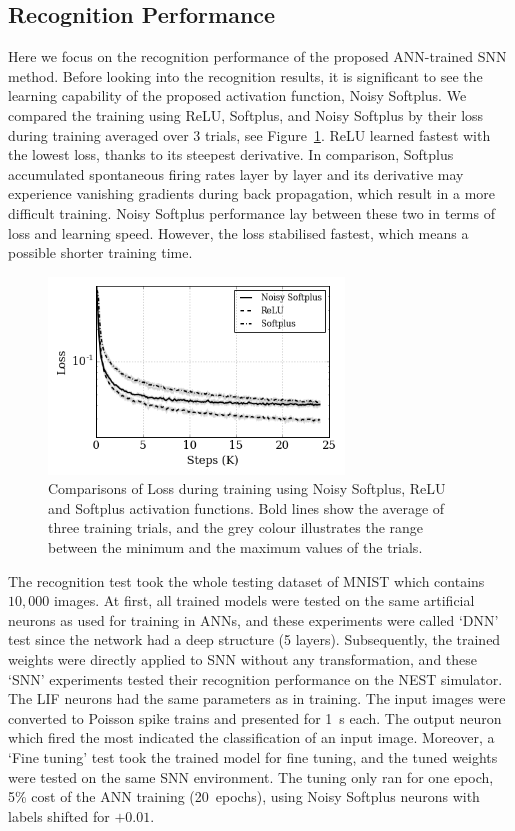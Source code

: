 	\subsection{Recognition Performance}
	\label{subsec:result_compare}
	Here we focus on the recognition performance of the proposed ANN-trained SNN method.
	Before looking into the recognition results, it is significant to see the learning capability of the proposed activation function, Noisy Softplus.
	We compared the training using ReLU, Softplus, and Noisy Softplus by their loss during training averaged over 3 trials, see Figure~\ref{Fig:loss_ns}.
	ReLU learned fastest with the lowest loss, thanks to its steepest derivative.
	In comparison, Softplus accumulated spontaneous firing rates layer by layer and its derivative may experience vanishing gradients during back propagation, which result in a more difficult training.
	Noisy Softplus performance lay between these two in terms of loss and learning speed.
	However, the loss stabilised fastest, which means a possible shorter training time.
	\begin{figure}[tbp!]
		\centering
		\includegraphics[width=0.7\textwidth]{pics_iconip/8.png}
		\caption{Comparisons of Loss during training using Noisy Softplus, ReLU and Softplus activation functions. Bold lines show the average of three training trials, and the grey colour illustrates the range between the minimum and the maximum values of the trials.  }
		\label{Fig:loss_ns}
	\end{figure}
	
	The recognition test took the whole testing dataset of MNIST which contains $10,000$ images.
	At first, all trained models were tested on the same artificial neurons as used for training in ANNs, and these experiments were called `DNN' test since the network had a deep structure (5 layers).
	Subsequently, the trained weights were directly applied to SNN without any transformation, and these `SNN' experiments tested their recognition performance on the NEST simulator.
	The LIF neurons had the same parameters as in training.
	The input images were converted to Poisson spike trains and presented for 1~s each.
	The output neuron which fired the most indicated the classification of an input image.
	Moreover, a `Fine tuning' test took the trained model for fine tuning, and the tuned weights were tested on the same SNN environment.
	The tuning only ran for one epoch, 5\% cost of the ANN training (20~epochs), using Noisy Softplus neurons with labels shifted for $+0.01$.
	
